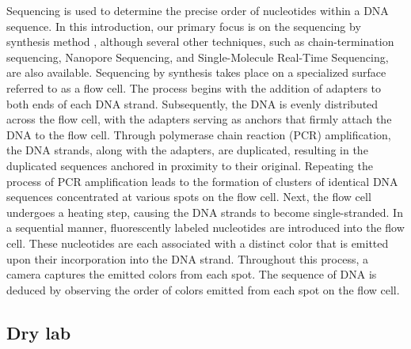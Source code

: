 Sequencing is used to determine the precise order of nucleotides within a DNA sequence. In this introduction, our primary focus is on the sequencing by synthesis method \cite{Canard1994}, although several other techniques, such as chain-termination sequencing\cite{Canard1994}, Nanopore Sequencing\cite{Jain2016}, and Single-Molecule Real-Time Sequencing\cite{Levene2003}, are also available. Sequencing by synthesis takes place on a specialized surface referred to as a flow cell. The process begins with the addition of adapters to both ends of each DNA strand. Subsequently, the DNA is evenly distributed across the flow cell, with the adapters serving as anchors that firmly attach the DNA to the flow cell. Through polymerase chain reaction (PCR) amplification, the DNA strands, along with the adapters, are duplicated, resulting in the duplicated sequences anchored in proximity to their original. Repeating the process of PCR amplification leads to the formation of clusters of identical DNA sequences concentrated at various spots on the flow cell. Next, the flow cell undergoes a heating step, causing the DNA strands to become single-stranded. In a sequential manner, fluorescently labeled nucleotides are introduced into the flow cell. These nucleotides are each associated with a distinct color that is emitted upon their incorporation into the DNA strand. Throughout this process, a camera captures the emitted colors from each spot. The sequence of DNA is deduced by observing the order of colors emitted from each spot on the flow cell.

\subsection{Dry lab}

